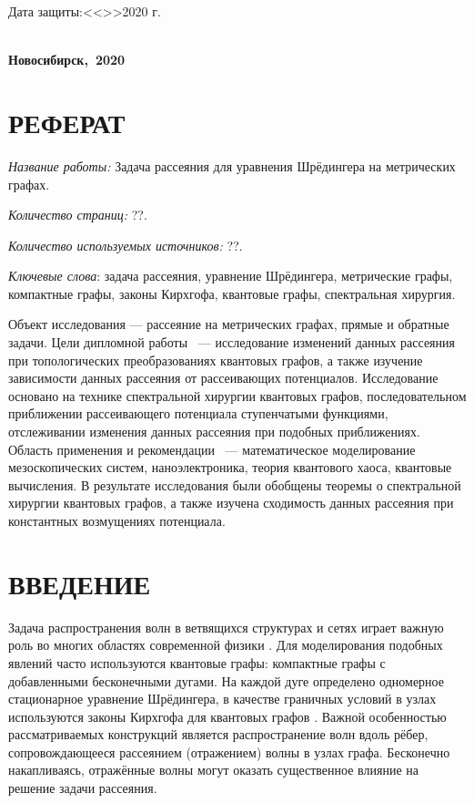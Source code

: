 \documentclass[a4 paper, 12 pt]{extarticle}
\begin{document}
	\hfill \break
	\begin{flushright}
		\large{Дата защиты:\large{<<\makebox[1cm]{\hrulefill}>>\makebox[4cm]{\hrulefill}2020 г.}}
	\end{flushright}
	
	\hfill \break
	\begin{singlespacing}
		\begin{center}
			\large{\textbf{\\Новосибирск,~2020}}
		\end{center} 
	\end{singlespacing}

	\section*{РЕФЕРАТ}
	{\it Название работы:} Задача рассеяния для уравнения Шрёдингера на метрических графах.
	
	{\it Количество страниц:} ??.
	
	{\it Количество используемых источников:} ??.
	
	{\it Ключевые слова}: задача рассеяния, уравнение Шрёдингера, метрические графы, компактные графы, законы Кирхгофа, квантовые графы, спектральная хирургия.
	
	Объект исследования --- рассеяние на метрических графах, прямые и обратные задачи. Цели дипломной работы ~--- исследование изменений данных рассеяния при топологических преобразованиях квантовых графов, а также изучение зависимости данных рассеяния от рассеивающих потенциалов. 	Исследование основано на технике спектральной хирургии квантовых графов, последовательном приближении рассеивающего потенциала ступенчатыми функциями, отслеживании изменения данных рассеяния при подобных приближениях. Область применения и рекомендации ~--- математическое моделирование мезоскопических систем, наноэлектроника, теория квантового хаоса, квантовые вычисления. В результате исследования были обобщены теоремы о спектральной хирургии квантовых графов, а также изучена сходимость данных рассеяния при константных возмущениях потенциала.
	
	\newpage
	\tableofcontents
	\newpage
	\section*{ВВЕДЕНИЕ}
	Задача распространения волн в ветвящихся структурах и сетях играет важную роль во многих областях современной физики \cite{TransparentQuantumGraphs}. Для моделирования подобных явлений часто используются квантовые графы: компактные графы с добавленными бесконечными дугами. На каждой дуге определено одномерное стационарное уравнение Шрёдингера, в качестве граничных условий в узлах используются законы Кирхгофа для квантовых графов \cite{KirchhoffRule}. Важной особенностью рассматриваемых конструкций является распространение волн вдоль рёбер, сопровождающееся рассеянием (отражением)  волны в узлах графа. Бесконечно накапливаясь, отражённые волны могут оказать существенное влияние на решение задачи рассеяния.
	
\end{document}
